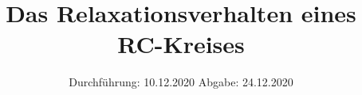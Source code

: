 

\subject{V353}
\title{Das Relaxationsverhalten eines RC-Kreises}
\date{%
  Durchführung: 10.12.2020
  \hspace{3em}
  Abgabe: 24.12.2020
}



\maketitle
\thispagestyle{empty}
\tableofcontents
\newpage





\nocite{*}
\printbibliography{}



